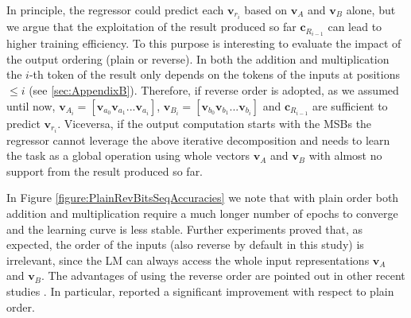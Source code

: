 \documentclass[final,1p,times,authoryear]{elsarticle}
\begin{document}
In principle, the regressor could predict each $\textbf{v}_{r_i}$ based on $\textbf{v}_A$ and $\textbf{v}_B$ alone, but we argue that the exploitation of the result produced so far $\textbf{c}_{R_{i-1}}$ can lead to higher training efficiency. To this purpose is interesting to evaluate the impact of the output ordering (plain or reverse). In both the addition and multiplication the $i$-th token of the result only depends on the tokens of the inputs at positions $\leq i$ (see \ref{sec:AppendixB}). Therefore, if reverse order is adopted, as we assumed until now, $\textbf{v}_{A_i}=[\textbf{v}_{a_0} \textbf{v}_{a_1}...\textbf{v}_{a_i}]$, $\textbf{v}_{B_i}=[\textbf{v}_{b_0} \textbf{v}_{b_1}...\textbf{v}_{b_i}]$ and $\textbf{c}_{R_{i-1}}$ are sufficient to predict $\textbf{v}_{r_i}$. Viceversa, if the output computation starts with the MSBs the regressor cannot leverage the above iterative decomposition and needs to learn the task as a global operation using whole vectors $\textbf{v}_A$ and $\textbf{v}_B$ with almost no support from the result produced so far.

In Figure \ref{figure:PlainRevBitsSeqAccuracies} we note that with plain order both addition and multiplication require a much longer number of epochs to converge and the learning curve is less stable. Further experiments proved that, as expected, the order of the inputs (also reverse by default in this study) is irrelevant, since the LM can always access the whole input representations $\textbf{v}_A$ and $\textbf{v}_B$. The advantages of using the reverse order are pointed out in other recent studies \citep{Nogueira2021,Lee2023}. In particular, \citet{Lee2023} reported a significant improvement with respect to plain order.
\end{document}
